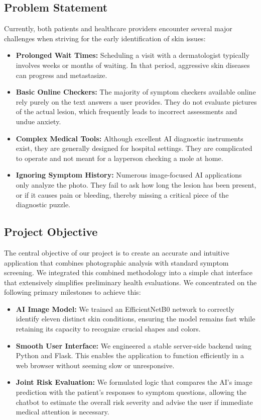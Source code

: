\documentclass[conference]{IEEEtran}
\begin{document}
\subsection{Problem Statement}
Currently, both patients and healthcare providers encounter several major challenges when striving for the early identification of skin issues:
\begin{itemize}
    \item \textbf{Prolonged Wait Times:} Scheduling a visit with a dermatologist typically involves weeks or months of waiting. In that period, aggressive skin diseases can progress and metastasize.
    \item \textbf{Basic Online Checkers:} The majority of symptom checkers available online rely purely on the text answers a user provides. They do not evaluate pictures of the actual lesion, which frequently leads to incorrect assessments and undue anxiety.
    \item \textbf{Complex Medical Tools:} Although excellent AI diagnostic instruments exist, they are generally designed for hospital settings. They are complicated to operate and not meant for a layperson checking a mole at home.
    \item \textbf{Ignoring Symptom History:} Numerous image-focused AI applications only analyze the photo. They fail to ask how long the lesion has been present, or if it causes pain or bleeding, thereby missing a critical piece of the diagnostic puzzle.
\end{itemize}

\subsection{Project Objective}
The central objective of our project is to create an accurate and intuitive application that combines photographic analysis with standard symptom screening. We integrated this combined methodology into a simple chat interface that extensively simplifies preliminary health evaluations. We concentrated on the following primary milestones to achieve this:
\begin{itemize}
    \item \textbf{AI Image Model:} We trained an EfficientNetB0 network to correctly identify eleven distinct skin conditions, ensuring the model remains fast while retaining its capacity to recognize crucial shapes and colors.
    \item \textbf{Smooth User Interface:} We engineered a stable server-side backend using Python and Flask. This enables the application to function efficiently in a web browser without seeming slow or unresponsive.
    \item \textbf{Joint Risk Evaluation:} We formulated logic that compares the AI’s image prediction with the patient’s responses to symptom questions, allowing the chatbot to estimate the overall risk severity and advise the user if immediate medical attention is necessary.
\end{itemize}
\end{document}
